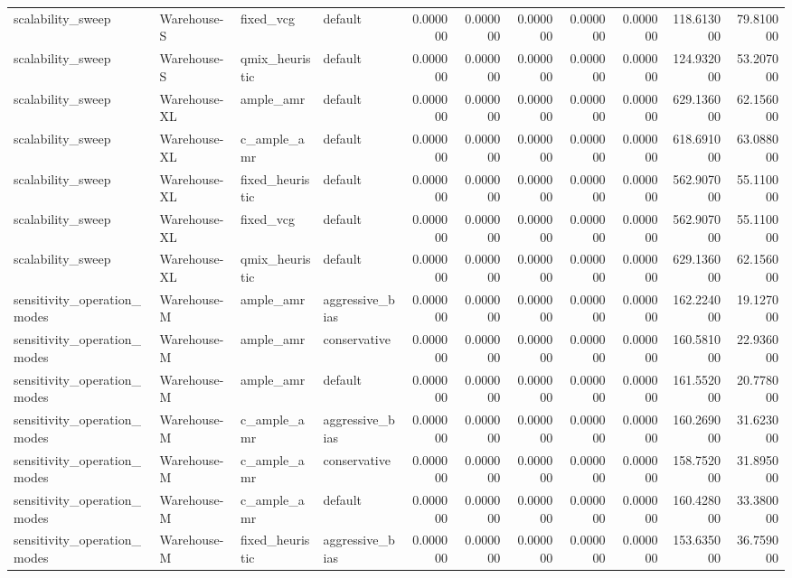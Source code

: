 \begin{tabular}{llllrrrrrrr}
scalability_sweep & Warehouse-S & fixed_vcg & default & 0.000000 & 0.000000 & 0.000000 & 0.000000 & 0.000000 & 118.613000 & 79.810000 \\
scalability_sweep & Warehouse-S & qmix_heuristic & default & 0.000000 & 0.000000 & 0.000000 & 0.000000 & 0.000000 & 124.932000 & 53.207000 \\
scalability_sweep & Warehouse-XL & ample_amr & default & 0.000000 & 0.000000 & 0.000000 & 0.000000 & 0.000000 & 629.136000 & 62.156000 \\
scalability_sweep & Warehouse-XL & c_ample_amr & default & 0.000000 & 0.000000 & 0.000000 & 0.000000 & 0.000000 & 618.691000 & 63.088000 \\
scalability_sweep & Warehouse-XL & fixed_heuristic & default & 0.000000 & 0.000000 & 0.000000 & 0.000000 & 0.000000 & 562.907000 & 55.110000 \\
scalability_sweep & Warehouse-XL & fixed_vcg & default & 0.000000 & 0.000000 & 0.000000 & 0.000000 & 0.000000 & 562.907000 & 55.110000 \\
scalability_sweep & Warehouse-XL & qmix_heuristic & default & 0.000000 & 0.000000 & 0.000000 & 0.000000 & 0.000000 & 629.136000 & 62.156000 \\
sensitivity_operation_modes & Warehouse-M & ample_amr & aggressive_bias & 0.000000 & 0.000000 & 0.000000 & 0.000000 & 0.000000 & 162.224000 & 19.127000 \\
sensitivity_operation_modes & Warehouse-M & ample_amr & conservative & 0.000000 & 0.000000 & 0.000000 & 0.000000 & 0.000000 & 160.581000 & 22.936000 \\
sensitivity_operation_modes & Warehouse-M & ample_amr & default & 0.000000 & 0.000000 & 0.000000 & 0.000000 & 0.000000 & 161.552000 & 20.778000 \\
sensitivity_operation_modes & Warehouse-M & c_ample_amr & aggressive_bias & 0.000000 & 0.000000 & 0.000000 & 0.000000 & 0.000000 & 160.269000 & 31.623000 \\
sensitivity_operation_modes & Warehouse-M & c_ample_amr & conservative & 0.000000 & 0.000000 & 0.000000 & 0.000000 & 0.000000 & 158.752000 & 31.895000 \\
sensitivity_operation_modes & Warehouse-M & c_ample_amr & default & 0.000000 & 0.000000 & 0.000000 & 0.000000 & 0.000000 & 160.428000 & 33.380000 \\
sensitivity_operation_modes & Warehouse-M & fixed_heuristic & aggressive_bias & 0.000000 & 0.000000 & 0.000000 & 0.000000 & 0.000000 & 153.635000 & 36.759000 \\

\end{tabular}
